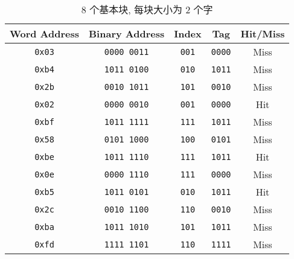 \documentclass[11pt]{homework}
\begin{document}
\begin{table}[!htbp]
    \centering
    \label{tab:1.2}
    \caption{8 个基本块, 每块大小为 2 个字}
    \begin{tabular}{|c|c|c|c|c|}
        \hline
        Word Address  & Binary Address     & Index        & Tag           & Hit/Miss \\ \hline
        \texttt{0x03} & \texttt{0000 0011} & \texttt{001} & \texttt{0000} & Miss     \\ \hline
        \texttt{0xb4} & \texttt{1011 0100} & \texttt{010} & \texttt{1011} & Miss     \\ \hline
        \texttt{0x2b} & \texttt{0010 1011} & \texttt{101} & \texttt{0010} & Miss     \\ \hline
        \texttt{0x02} & \texttt{0000 0010} & \texttt{001} & \texttt{0000} & Hit      \\ \hline
        \texttt{0xbf} & \texttt{1011 1111} & \texttt{111} & \texttt{1011} & Miss     \\ \hline
        \texttt{0x58} & \texttt{0101 1000} & \texttt{100} & \texttt{0101} & Miss     \\ \hline
        \texttt{0xbe} & \texttt{1011 1110} & \texttt{111} & \texttt{1011} & Hit      \\ \hline
        \texttt{0x0e} & \texttt{0000 1110} & \texttt{111} & \texttt{0000} & Miss     \\ \hline
        \texttt{0xb5} & \texttt{1011 0101} & \texttt{010} & \texttt{1011} & Hit      \\ \hline
        \texttt{0x2c} & \texttt{0010 1100} & \texttt{110} & \texttt{0010} & Miss     \\ \hline
        \texttt{0xba} & \texttt{1011 1010} & \texttt{101} & \texttt{1011} & Miss     \\ \hline
        \texttt{0xfd} & \texttt{1111 1101} & \texttt{110} & \texttt{1111} & Miss     \\ \hline
    \end{tabular}
\end{table}
\newpage
\question
\end{document}
